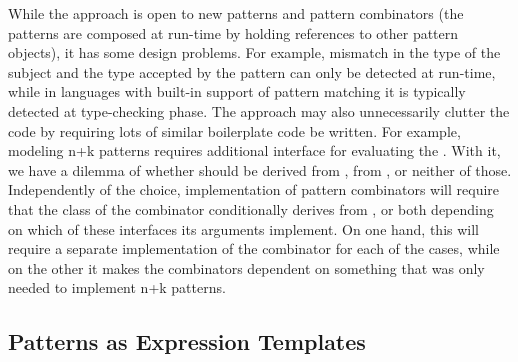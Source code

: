 While the approach is open to new patterns and pattern combinators (the patterns 
are composed at run-time by holding references to other pattern objects), it has 
some design problems. For example, mismatch in the type of the subject and the 
type accepted by the pattern can only be detected at run-time, while in 
languages with built-in support of pattern matching it is typically detected at 
type-checking phase. The approach may also unnecessarily clutter the code by 
requiring lots of similar boilerplate code be written. For example, modeling n+k 
patterns requires additional interface for evaluating the . 
With it, we have a dilemma of whether  should be derived from 
,  from , or neither of those. 
Independently of the choice, implementation of pattern combinators will require 
that the class of the combinator conditionally derives from , 
 or both depending on which of these interfaces its arguments 
implement. On one hand, this will require a separate implementation of the 
combinator for each of the cases, while on the other it makes the combinators 
dependent on something that was only needed to implement n+k patterns.


\subsection{Patterns as Expression Templates}
\label{sec:pat}

